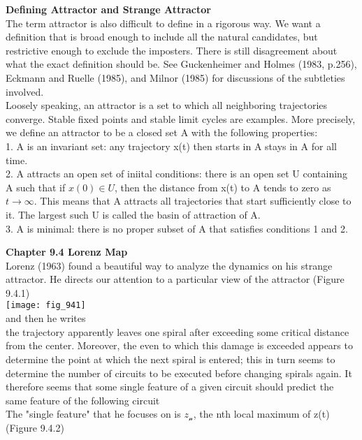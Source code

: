 \documentclass{article}
\newcommand\tab[1][1cm]{\hspace*{#1}}
\begin{document}
\textbf {Defining Attractor and Strange Attractor} \\ \tab
The term attractor is also difficult to define in a rigorous way. We want a definition that is broad enough to include all the natural candidates, but restrictive enough to exclude the imposters. There is still disagreement about what the exact definition should be. See Guckenheimer and Holmes (1983, p.256), Eckmann and Ruelle (1985), and Milnor (1985) for discussions of the subtleties involved. \\ \tab
Loosely speaking, an attractor is a set to which all neighboring trajectories converge. Stable fixed points and stable limit cycles are examples. More precisely, we define an attractor to be a closed set A with the following properties: \\ \tab \tab
1. A is an invariant set: any trajectory x(t) then starts in A stays in A for all time. \\ \tab \tab
2. A attracts an open set of iniital conditions: there is an open set U containing A such that if $x(0) \in U$, then the distance from x(t) to A tends to zero as $t \to \infty$. This means that A attracts all trajectories that start sufficiently close to it. The largest such U is called the basin of attraction of A. \\ \tab \tab
3. A is minimal: there is no proper subset of A that satisfies conditions 1 and 2. 

\textbf {Chapter 9.4 Lorenz Map} \\ 
Lorenz (1963) found a beautiful way to analyze the dynamics on his strange attractor. He directs our attention to a particular view of the attractor (Figure 9.4.1) \\

\texttt{[image: fig\_941]} \\
and then he writes 
\\ the trajectory apparently leaves one spiral after exceeding some critical distance from the center. Moreover, the even to which this damage is exceeded appears to determine the point at which the next spiral is entered; this in turn seems to determine the number of circuits to be executed before changing spirals again. It therefore seems that some single feature of a given circuit should predict the same feature of the following circuit \\
The "single feature" that he focuses on is $z_{\mathcal{n}}$, the nth local maximum of z(t) (Figure 9.4.2) \\
\end{document}
